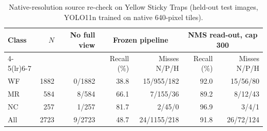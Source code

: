 \begin{table}[!htbp]
\scriptsize
\caption{Native-resolution source re-check on Yellow Sticky Traps (held-out test images, YOLO11n trained on native 640-pixel tiles).}
\label{tab:yst}
\begin{tabular*}{\textwidth}{@{\extracolsep{\fill}}lrrrrrr}
\toprule
Class & $N$ & No full view & \multicolumn{2}{c}{Frozen pipeline} & \multicolumn{2}{c}{NMS read-out, cap 300} \\ \cmidrule(lr){4-5}\cmidrule(lr){6-7} & & & Recall (\%) & Misses N/P/H & Recall (\%) & Misses N/P/H \\
\midrule
WF & 1882 & 0/1882 & 38.8 & 15/955/182 & 92.0 & 15/56/80 \\
MR & 584 & 8/584 & 66.1 & 7/155/36 & 89.2 & 8/12/43 \\
NC & 257 & 1/257 & 81.7 & 2/45/0 & 96.9 & 3/4/1 \\
All & 2723 & 9/2723 & 48.7 & 24/1155/218 & 91.8 & 26/72/124 \\
\bottomrule
\end{tabular*}
\end{table}
